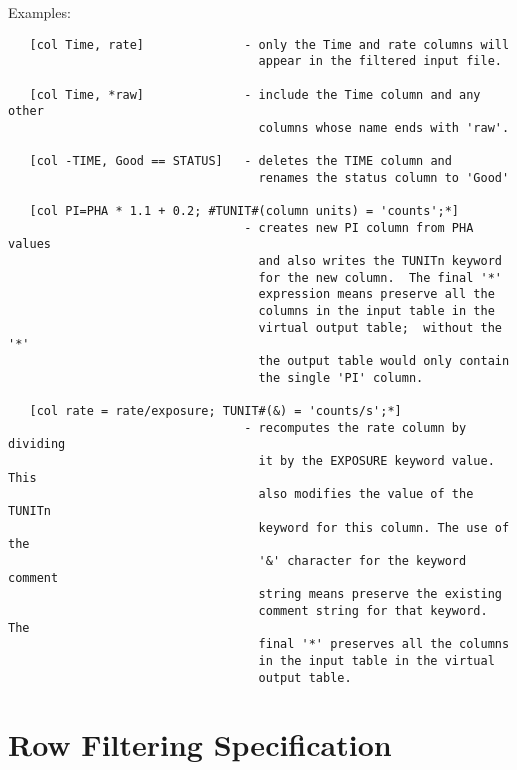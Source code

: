 \documentclass[11pt]{book}
\begin{document}
Examples:

\begin{verbatim}
   [col Time, rate]              - only the Time and rate columns will
                                   appear in the filtered input file.

   [col Time, *raw]              - include the Time column and any other
                                   columns whose name ends with 'raw'.

   [col -TIME, Good == STATUS]   - deletes the TIME column and
                                   renames the status column to 'Good'

   [col PI=PHA * 1.1 + 0.2; #TUNIT#(column units) = 'counts';*]
                                 - creates new PI column from PHA values
                                   and also writes the TUNITn keyword
                                   for the new column.  The final '*'
                                   expression means preserve all the
                                   columns in the input table in the
                                   virtual output table;  without the '*'
                                   the output table would only contain
                                   the single 'PI' column.

   [col rate = rate/exposure; TUNIT#(&) = 'counts/s';*]
                                 - recomputes the rate column by dividing
                                   it by the EXPOSURE keyword value. This
                                   also modifies the value of the TUNITn
                                   keyword for this column. The use of the
                                   '&' character for the keyword comment
                                   string means preserve the existing
                                   comment string for that keyword. The
                                   final '*' preserves all the columns
                                   in the input table in the virtual
                                   output table.
\end{verbatim}


\section{Row Filtering Specification}
\end{document}
